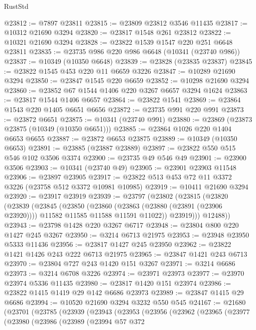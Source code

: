 \begin{lexlean}{RustStd}
\begin{coremodule}
{\begin{coremodule}
{{{{{{{{{{{{{{{{{{{{{{{{{@23812 := @7897 @23811
@23815 := @23809 @23812 @3546 @11435
@23817 := @10312 @21690 @3294
@23820 := @23817 @1548 @261 @23812
@23822 := @10321 @21690 @3294
@23828 := @23822 @1539 @1547 @220 @251 @6648 @23811
@23835 := @23735 @986 @220 @986 @6648 (@10341 (@23740 @986))
@23837 := @10349 (@10350 @6648)
@23839 := @23828 (@23835 @23837)
@23845 := @23822 @1545 @453 @220 @11 @6659 @3226
@23847 := @10289 @21690 @3294
@23850 := @23847 @1545 @220 @6659
@23852 := @10298 @21690 @3294
@23860 := @23852 @67 @1544 @1406 @220 @3267 @6657 @3294 @1624
@23863 := @23817 @1544 @1406 @6657
@23864 := @23822 @1541
@23869 := @23864 @1543 @220 @1405 @6651 @6656
@23872 := @23735 @991 @220 @991
@23873 := @23872 @6651
@23875 := @10341 (@23740 @991)
@23880 := @23869 (@23873 @23875 (@10349 (@10350 @6651)))
@23885 := @23864 @1026 @220 @1404 @6653 @6655
@23887 := @23872 @6653 @23875
@23889 := @10349 (@10350 @6653)
@23891 := @23885 (@23887 @23889)
@23897 := @23822 @550 @515 @546 @102 @3506 @3374
@23900 := @23735 @49 @546 @49
@23901 := @23900 @3506
@23903 := @10341 (@23740 @49)
@23905 := @23901 @23903 @11548
@23906 := @23897 @23905
@23917 := @23822 @513 @453 @72 @11 @3372 @3226 (@23758 @512 @3372 @10981 @10985)
@23919 := @10411 @21690 @3294
@23920 := @23917 @23919
@23939 := @23797
    (@23802
      (@23815
        (@23820
          (@23839
            (@23845
              (@23850
                (@23860
                  (@23863 (@23880 (@23891 (@23906 @23920))))
                  @11582
                  @11585
                  @11588
                  @11591
                  @11022))
              @23919)))
        @12488))
@23943 := @23798 @1428 @220 @3267 @6717
@23948 := @23804 @800 @220 @1427 @245 @3267
@23950 := @3214 @6713 @21975
@23953 := @23948 @23950 @5333 @11436
@23956 := @23817 @1427 @245 @23950
@23962 := @23822 @1421 @1426 @243 @222 @6713 @21975
@23965 := @23847 @1421 @243 @6713
@23970 := @23804 @727 @243 @1420 @151 @3267
@23971 := @3214 @6686
@23973 := @3214 @6708 @3226
@23974 := @23971 @23973
@23977 := @23970 @23974 @5336 @11435
@23980 := @23817 @1420 @151 @23974
@23986 := @23822 @1415 @1419 @29 @142 @6686 @23973
@23989 := @23847 @1415 @29 @6686
@23994 := @10520 @21690 @3294 @3232 @550 @545
@24167 := @21680
    (@23701
      (@23785
        (@23939
          (@23943
            (@23953
              (@23956
                (@23962
                  (@23965
                    (@23977
                      (@23980
                        (@23986
                          (@23989
                            (@23994
                              @57
                              @372
}}}}}}}}}}}}}}}}}}}}}}}}}
\end{coremodule}}
\end{coremodule}
\end{lexlean}
